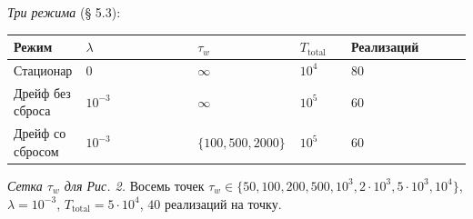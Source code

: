 \documentclass[pdflatex,sn-mathphys-ay]{sn-jnl}
\begin{document}
\emph{Три режима} (§ 5.3):



\begin{center}\small
\begin{tabular}{@{} >{\raggedright\arraybackslash}p{0.1556\linewidth} >{\raggedright\arraybackslash}p{0.2444\linewidth} >{\raggedright\arraybackslash}p{0.2222\linewidth} >{\raggedright\arraybackslash}p{0.1111\linewidth} >{\raggedright\arraybackslash}p{0.2667\linewidth}@{}}
\toprule

\begin{minipage}[b]{\linewidth}\raggedright

Режим

\end{minipage} & \begin{minipage}[b]{\linewidth}\raggedright

\(\lambda\)

\end{minipage} & \begin{minipage}[b]{\linewidth}\raggedright

\(\tau_w\)

\end{minipage} & \begin{minipage}[b]{\linewidth}\raggedright

\(T_{\text{total}}\)

\end{minipage} & \begin{minipage}[b]{\linewidth}\raggedright

Реализаций

\end{minipage} \\

\midrule

Стационар & \(0\) & \(\infty\) & \(10^4\) & \(80\) \\

Дрейф без сброса & \(10^{-3}\) & \(\infty\) & \(10^5\) & \(60\) \\

Дрейф со сбросом & \(10^{-3}\) & \(\{100, 500, 2000\}\) & \(10^5\) & \(60\) \\

\bottomrule
\end{tabular}
\end{center}


\emph{Сетка \(\tau_w\) для Рис. 2.} Восемь точек \(\tau_w \in \{50, 100, 200, 500, 10^3, 2 \cdot 10^3, 5 \cdot 10^3, 10^4\}\), \(\lambda = 10^{-3}\), \(T_{\text{total}} = 5 \cdot 10^4\), \(40\) реализаций на точку.
\end{document}
